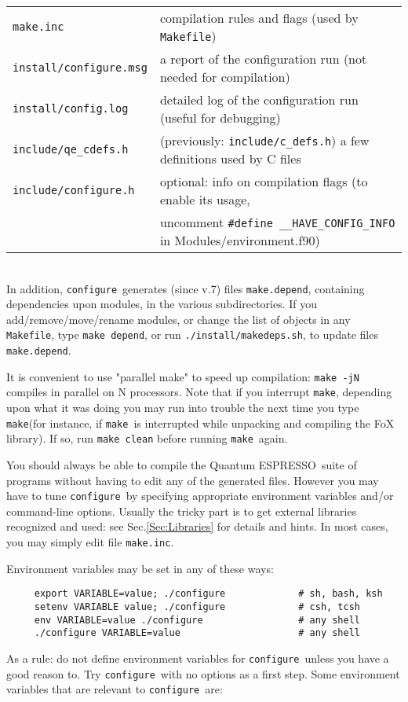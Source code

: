 \documentclass[12pt,a4paper]{article}
\def\qe{{\sc Quantum ESPRESSO}}
\def\configure{\texttt{configure}}
\def\make{\texttt{make}}
\begin{document}
\begin{tabular}{ll}
\texttt{make.inc} &      compilation rules and flags (used by \texttt{Makefile})\\
\texttt{install/configure.msg} & a report of the configuration run (not needed for compilation)\\
\texttt{install/config.log} & detailed log of the configuration run (useful for debugging)\\
	\texttt{include/qe\_cdefs.h} &  (previously: \texttt{include/c\_defs.h})
	a few definitions used by C files\\
\texttt{include/configure.h} &  optional: info on compilation flags
	(to enable its usage, \\ & uncomment \verb|#define __HAVE_CONFIG_INFO|
	 in Modules/environment.f90)\\
\end{tabular}\\
In addition, \configure\ generates (since v.7) files \texttt{make.depend},
containing dependencies upon modules, in the various subdirectories.
If you add/remove/move/rename modules, or change the list of objects
in any \texttt{Makefile}, type \texttt{make depend}, or run 
\texttt{./install/makedeps.sh}, to update files \texttt{make.depend}.

It is convenient to use "parallel make" to speed up compilation:
\texttt{make -jN} compiles in parallel on N processors. Note that
if you interrupt \make, depending upon what it was doing
you may run into trouble the next time you type \make (for instance,
if \make\ is interrupted while unpacking and compiling the FoX library).
If so, run \texttt{make clean} before running \make\ again.

You should always be able to compile the \qe\ suite
of programs without having to edit any of the generated files. However you
may have to tune \configure\ by specifying appropriate environment variables
and/or command-line options. Usually the tricky part is to get external
libraries recognized and used: see Sec.\ref{Sec:Libraries}
for details and hints. In most cases, you may simply edit file
\texttt{make.inc}. 

Environment variables may be set in any of these ways:
\begin{verbatim}
     export VARIABLE=value; ./configure             # sh, bash, ksh
     setenv VARIABLE value; ./configure             # csh, tcsh
     env VARIABLE=value ./configure                 # any shell
     ./configure VARIABLE=value                     # any shell
\end{verbatim}
As a rule: do not define environment variables for \configure\ unless
you have a good reason to. Try \configure\ with no options as a first step.
Some environment variables that are relevant to \configure\ are:
\end{document}
